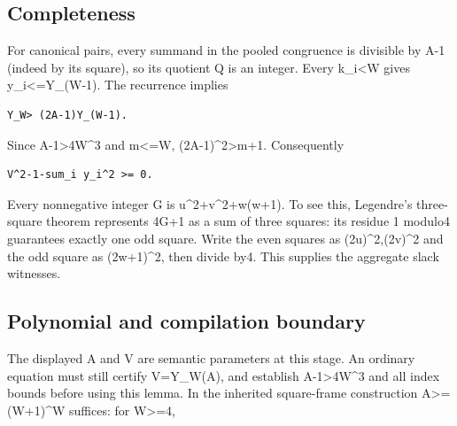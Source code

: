 \subsection{Completeness}



For canonical pairs, every summand in the pooled congruence is divisible by A-1 (indeed by its square), so its quotient Q is an integer. Every k\_\allowbreak{}i\textless{}\allowbreak{}W gives y\_\allowbreak{}i\textless{}\allowbreak{}=\allowbreak{}Y\_\allowbreak{}(W-1). The recurrence implies



\begin{verbatim}
Y_W> (2A-1)Y_(W-1).
\end{verbatim}

Since A-1\textgreater{}\allowbreak{}4W\textasciicircum{}\allowbreak{}3 and m\textless{}\allowbreak{}=\allowbreak{}W, (2A-1)\textasciicircum{}\allowbreak{}2\textgreater{}\allowbreak{}m+\allowbreak{}1. Consequently



\begin{verbatim}
V^2-1-sum_i y_i^2 >= 0.
\end{verbatim}

Every nonnegative integer G is u\textasciicircum{}\allowbreak{}2+\allowbreak{}v\textasciicircum{}\allowbreak{}2+\allowbreak{}w(w+\allowbreak{}1). To see this, Legendre's three-square theorem represents 4G+\allowbreak{}1 as a sum of three squares: its residue 1 modulo4 guarantees exactly one odd square. Write the even squares as (2u)\textasciicircum{}\allowbreak{}2,(2v)\textasciicircum{}\allowbreak{}2 and the odd square as (2w+\allowbreak{}1)\textasciicircum{}\allowbreak{}2, then divide by4. This supplies the aggregate slack witnesses.



\subsection{Polynomial and compilation boundary}



The displayed A and V are semantic parameters at this stage. An ordinary equation must still certify V=\allowbreak{}Y\_\allowbreak{}W(A), and establish A-1\textgreater{}\allowbreak{}4W\textasciicircum{}\allowbreak{}3 and all index bounds before using this lemma. In the inherited square-frame construction A\textgreater{}\allowbreak{}=\allowbreak{} (W+\allowbreak{}1)\textasciicircum{}\allowbreak{}W suffices: for W\textgreater{}\allowbreak{}=\allowbreak{}4,




